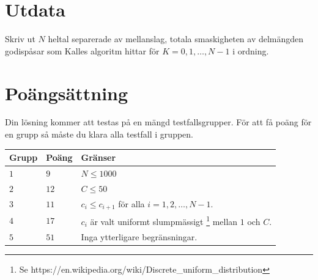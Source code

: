 \section*{Utdata}
Skriv ut $N$ heltal separerade av mellanslag, totala smaskigheten av delmängden godispåsar som Kalles
algoritm hittar för $K=0,1,\dots,N-1$ i ordning. 

\section*{Poängsättning}
Din lösning kommer att testas på en mängd testfallsgrupper.
För att få poäng för en grupp så måste du klara alla testfall i gruppen.

\noindent
\begin{tabular}{| l | l | p{12cm} |}
  \hline
  \textbf{Grupp} & \textbf{Poäng} & \textbf{Gränser} \\ \hline
  $1$    & $9$        & $N \leq 1000$ \\ \hline
  $2$    & $12$       & $C \leq 50$ \\ \hline
  $3$    & $11$       & $c_i \leq c_{i+1}$ för alla $i=1,2,\dots,N-1$. \\ \hline
  $4$    & $17$       & $c_i$ är valt uniformt slumpmässigt \footnote{Se https://en.wikipedia.org/wiki/Discrete\_uniform\_distribution} mellan $1$ och $C$. \\ \hline
  $5$    & $51$       & Inga ytterligare begränsningar. \\ \hline
\end{tabular}


